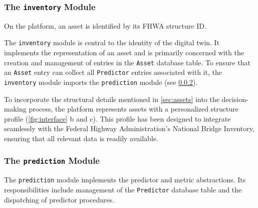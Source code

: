 


\subsubsection{The \texttt{inventory} Module}\label{sec:inventory-module}

On the \BRACE{} platform, an \gls{asset} is identified by its FHWA structure ID.

The \texttt{inventory} module is central to the identity of the digital twin. It implements the representation of an \gls{asset} and is primarily concerned with the creation and management of entries in the \texttt{Asset} database table. %
To ensure that an \texttt{Asset} entry can collect all \texttt{Predictor} entries associated with it, the \texttt{inventory} module imports the \texttt{prediction} module (see \cref{sec:prediction-module}).

To incorporate the structural details mentioned in \cref{sec:assets} into the decision-making process, the platform represents assets with a personalized structure profile (\cref{fig:interface} b and c). 
This profile has been designed to integrate seamlessly with the Federal Highway Administration’s National Bridge Inventory, ensuring that all relevant data is readily available.


\subsubsection{The \texttt{prediction} Module}\label{sec:prediction-module}
%
The \texttt{prediction} module implements the predictor and metric abstractions. Its responsibilities include management of the \texttt{Predictor} database table and the dispatching of predictor procedures.

